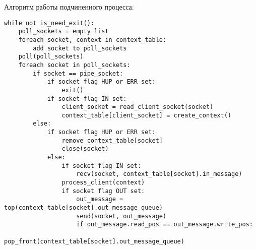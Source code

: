 Алгоритм работы подчиненного процесса:
\begin{verbatim}
while not is_need_exit():
    poll_sockets = empty list
    foreach socket, context in context_table:
        add socket to poll_sockets
    poll(poll_sockets)
    foreach socket in poll_sockets:
        if socket == pipe_socket:
            if socket flag HUP or ERR set:
                exit()
            if socket flag IN set:
                client_socket = read_client_socket(socket)
                context_table[client_socket] = create_context()
        else:
            if socket flag HUP or ERR set:
                remove context_table[socket]
                close(socket)
            else:
                if socket flag IN set:
                    recv(socket, context_table[socket].in_message)
                process_client(context)
                if socket flag OUT set:
                    out_message = top(context_table[socket].out_message_queue)
                    send(socket, out_message)
                    if out_message.read_pos == out_message.write_pos:
                        pop_front(context_table[socket].out_message_queue)
\end{verbatim}
